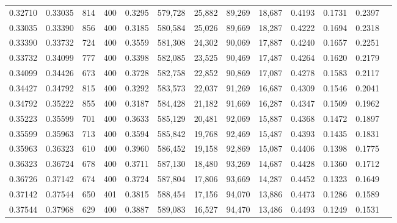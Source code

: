 \begin{tabular}{rrrrrrrrrrrrr}
0.32710 & 0.33035 &    814 & 400 &                                     0.3295 & 579,728 &  25,882 &  89,269 &  18,687 & 0.4193 & 0.1731 & 0.2397 \\
0.33035 & 0.33390 &    856 & 400 &                                     0.3185 & 580,584 &  25,026 &  89,669 &  18,287 & 0.4222 & 0.1694 & 0.2318 \\
0.33390 & 0.33732 &    724 & 400 &                                     0.3559 & 581,308 &  24,302 &  90,069 &  17,887 & 0.4240 & 0.1657 & 0.2251 \\
0.33732 & 0.34099 &    777 & 400 &                                     0.3398 & 582,085 &  23,525 &  90,469 &  17,487 & 0.4264 & 0.1620 & 0.2179 \\
0.34099 & 0.34426 &    673 & 400 &                                     0.3728 & 582,758 &  22,852 &  90,869 &  17,087 & 0.4278 & 0.1583 & 0.2117 \\
0.34427 & 0.34792 &    815 & 400 &                                     0.3292 & 583,573 &  22,037 &  91,269 &  16,687 & 0.4309 & 0.1546 & 0.2041 \\
0.34792 & 0.35222 &    855 & 400 &                                     0.3187 & 584,428 &  21,182 &  91,669 &  16,287 & 0.4347 & 0.1509 & 0.1962 \\
0.35223 & 0.35599 &    701 & 400 &                                     0.3633 & 585,129 &  20,481 &  92,069 &  15,887 & 0.4368 & 0.1472 & 0.1897 \\
0.35599 & 0.35963 &    713 & 400 &                                     0.3594 & 585,842 &  19,768 &  92,469 &  15,487 & 0.4393 & 0.1435 & 0.1831 \\
0.35963 & 0.36323 &    610 & 400 &                                     0.3960 & 586,452 &  19,158 &  92,869 &  15,087 & 0.4406 & 0.1398 & 0.1775 \\
0.36323 & 0.36724 &    678 & 400 &                                     0.3711 & 587,130 &  18,480 &  93,269 &  14,687 & 0.4428 & 0.1360 & 0.1712 \\
0.36726 & 0.37142 &    674 & 400 &                                     0.3724 & 587,804 &  17,806 &  93,669 &  14,287 & 0.4452 & 0.1323 & 0.1649 \\
0.37142 & 0.37544 &    650 & 401 &                                     0.3815 & 588,454 &  17,156 &  94,070 &  13,886 & 0.4473 & 0.1286 & 0.1589 \\
0.37544 & 0.37968 &    629 & 400 &                                     0.3887 & 589,083 &  16,527 &  94,470 &  13,486 & 0.4493 & 0.1249 & 0.1531 \\

\end{tabular}
